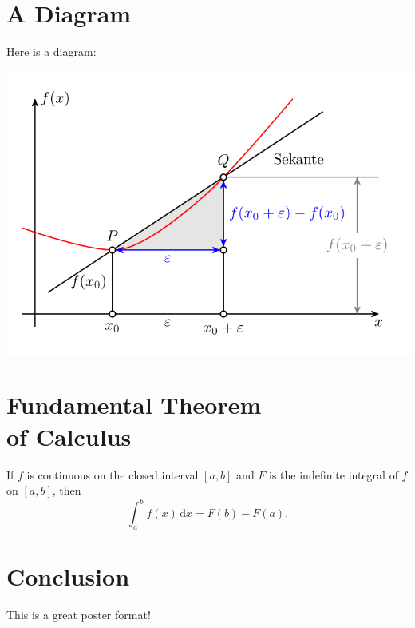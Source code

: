 \documentclass[fleqn,landscape]{betterposter}
\begin{document}
{  \section{A Diagram}
  Here is a diagram:
  \begin{center}
    \includegraphics[width=\textwidth]{img/tikzexample1}
  \end{center}

  \section{Fundamental Theorem\\of Calculus}
  If \(f\) is continuous on the closed interval \([a,b]\) and \(F\) is the indefinite integral of \(f\) on \([a,b]\), then
  \begin{equation}
    \int_a^b f(x)\,\mathrm{d}x = F(b)-F(a).
  \end{equation}

  \section{Conclusion}
  This is a great poster format!

}{

}
\end{document}
